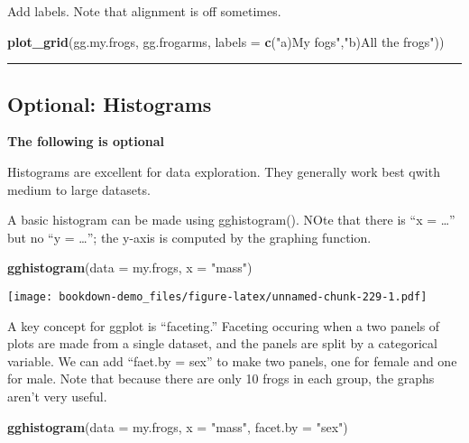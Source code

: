\documentclass[]{book}
\newenvironment{Shaded}{\begin{snugshade}}{\end{snugshade}}
\newcommand{\KeywordTok}[1]{\textcolor[rgb]{0.13,0.29,0.53}{\textbf{#1}}}
\newcommand{\DataTypeTok}[1]{\textcolor[rgb]{0.13,0.29,0.53}{#1}}
\newcommand{\StringTok}[1]{\textcolor[rgb]{0.31,0.60,0.02}{#1}}
\newcommand{\NormalTok}[1]{#1}
\theoremstyle{definition}
\theoremstyle{definition}
\theoremstyle{definition}
\theoremstyle{remark}
\begin{document}
Add labels. Note that alignment is off sometimes.

\begin{Shaded}
\begin{Highlighting}[]
\KeywordTok{plot_grid}\NormalTok{(gg.my.frogs, }
\NormalTok{          gg.frogarms,}
          \DataTypeTok{labels =} \KeywordTok{c}\NormalTok{(}\StringTok{"a)My fogs"}\NormalTok{,}\StringTok{"b)All the frogs"}\NormalTok{))}
\end{Highlighting}
\end{Shaded}

\begin{center}\rule{0.5\linewidth}{\linethickness}\end{center}

\subsection{Optional: Histograms}\label{optional-histograms}

\textbf{The following is optional}

Histograms are excellent for data exploration. They generally work best
qwith medium to large datasets.

A basic histogram can be made using gghistogram(). NOte that there is
``x = \ldots{}'' but no ``y = \ldots{}''; the y-axis is computed by the
graphing function.

\begin{Shaded}
\begin{Highlighting}[]
\KeywordTok{gghistogram}\NormalTok{(}\DataTypeTok{data =}\NormalTok{ my.frogs, }
            \DataTypeTok{x =} \StringTok{"mass"}\NormalTok{)}
\end{Highlighting}
\end{Shaded}

\texttt{[image: bookdown-demo\_files/figure-latex/unnamed-chunk-229-1.pdf]}

A key concept for ggplot is ``faceting.'' Faceting occuring when a two
panels of plots are made from a single dataset, and the panels are split
by a categorical variable. We can add ``faet.by = sex'' to make two
panels, one for female and one for male. Note that because there are
only 10 frogs in each group, the graphs aren't very useful.

\begin{Shaded}
\begin{Highlighting}[]
\KeywordTok{gghistogram}\NormalTok{(}\DataTypeTok{data =}\NormalTok{ my.frogs, }
            \DataTypeTok{x =} \StringTok{"mass"}\NormalTok{,}
            \DataTypeTok{facet.by =} \StringTok{"sex"}\NormalTok{)}
\end{Highlighting}
\end{Shaded}
\end{document}
